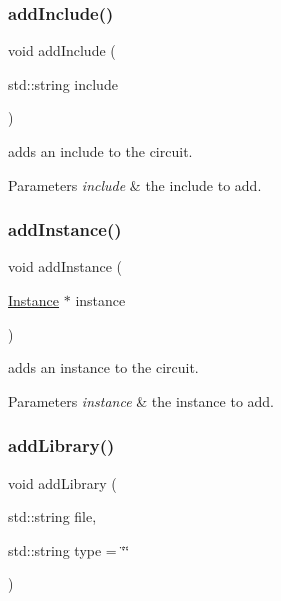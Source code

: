 \subsubsection{\texorpdfstring{add\+Include()}{addInclude()}}
{\footnotesize\ttfamily void add\+Include (\begin{DoxyParamCaption}\item[{std\+::string}]{include }\end{DoxyParamCaption})\hspace{0.3cm}{\ttfamily [inline]}}



adds an include to the circuit. 


\begin{DoxyParams}{Parameters}
{\em include} & the include to add. \\
\hline
\end{DoxyParams}
\mbox{\label{class_s_p_i_c_e_1_1_circuit_a7bb4a4532643568ab1ac2c229185a88e}} 
\subsubsection{\texorpdfstring{add\+Instance()}{addInstance()}}
{\footnotesize\ttfamily void add\+Instance (\begin{DoxyParamCaption}\item[{\mbox{\hyperlink{class_s_p_i_c_e_1_1_instance}{Instance}} $\ast$}]{instance }\end{DoxyParamCaption})\hspace{0.3cm}{\ttfamily [inline]}}



adds an instance to the circuit. 


\begin{DoxyParams}{Parameters}
{\em instance} & the instance to add. \\
\hline
\end{DoxyParams}
\mbox{\label{class_s_p_i_c_e_1_1_circuit_a49939060cc1cb8e4bfaf003025032096}} 
\subsubsection{\texorpdfstring{add\+Library()}{addLibrary()}}
{\footnotesize\ttfamily void add\+Library (\begin{DoxyParamCaption}\item[{std\+::string}]{file,  }\item[{std\+::string}]{type = {\ttfamily \char`\"{}\char`\"{}} }\end{DoxyParamCaption})\hspace{0.3cm}{\ttfamily [inline]}}



